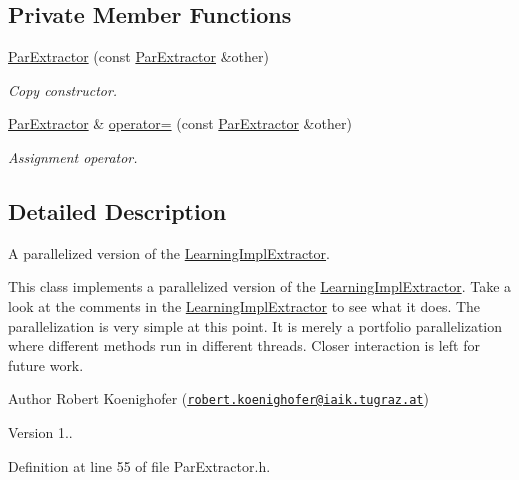 \subsection*{Private Member Functions}
\begin{DoxyCompactItemize}
\item 
\hyperlink{classParExtractor_ab25b8eb8fdc7809ec1da8fdef0d63ff2}{Par\-Extractor} (const \hyperlink{classParExtractor}{Par\-Extractor} \&other)
\begin{DoxyCompactList}\small\item\em Copy constructor. \end{DoxyCompactList}\item 
\hyperlink{classParExtractor}{Par\-Extractor} \& \hyperlink{classParExtractor_a20e656cfc9fa6541e91b11846032a5f5}{operator=} (const \hyperlink{classParExtractor}{Par\-Extractor} \&other)
\begin{DoxyCompactList}\small\item\em Assignment operator. \end{DoxyCompactList}\end{DoxyCompactItemize}


\subsection{Detailed Description}
A parallelized version of the \hyperlink{classLearningImplExtractor}{Learning\-Impl\-Extractor}. 

This class implements a parallelized version of the \hyperlink{classLearningImplExtractor}{Learning\-Impl\-Extractor}. Take a look at the comments in the \hyperlink{classLearningImplExtractor}{Learning\-Impl\-Extractor} to see what it does. The parallelization is very simple at this point. It is merely a portfolio parallelization where different methods run in different threads. Closer interaction is left for future work.

\begin{DoxyAuthor}{Author}
Robert Koenighofer (\href{mailto:robert.koenighofer@iaik.tugraz.at}{\tt robert.\-koenighofer@iaik.\-tugraz.\-at}) 
\end{DoxyAuthor}
\begin{DoxyVersion}{Version}
1.. 
\end{DoxyVersion}


Definition at line 55 of file Par\-Extractor.\-h.



